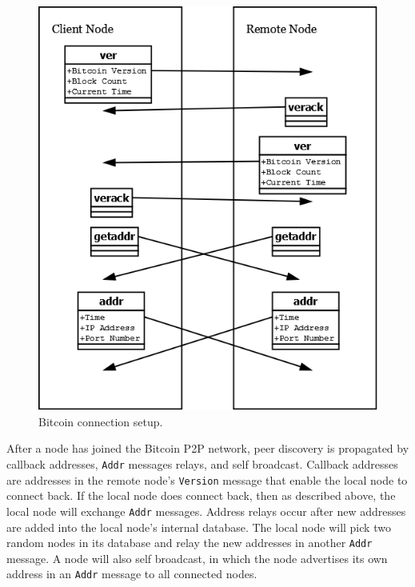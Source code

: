 \begin{figure}[ht!]
\begin{center}
\includegraphics[scale=0.3]{./images/bitcoin_peer_protocol.png}
\caption{Bitcoin connection setup.}
\label{fig:bitcoin_peer_protocol}
\end{center}
\end{figure}

After a node has joined the Bitcoin P2P network, peer discovery is propagated by callback addresses, {\tt Addr} messages relays, and self broadcast. Callback addresses are addresses in the remote node's {\tt Version} message that enable the local node to connect back.  If the local node does connect back, then as described above, the local node will exchange {\tt Addr} messages.  Address relays occur after new addresses are added into the local node's internal database. The local node will pick two random nodes in its database and relay the new addresses in another {\tt Addr} message. A node will also self broadcast, in which the node advertises its own address in an {\tt Addr} message to all connected nodes.

